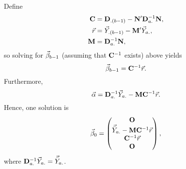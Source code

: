 Define
\begin{align*}
    \mathbf{C} & =\mathbf{D}_{.(b-1)}-\mathbf{N}'\mathbf{D}_{a.}^{-1}\mathbf{N}, \\
    \vec{r} & =\vec{Y}_{.(b-1)}-\mathbf{M}'\vec{Y}_{a.},                \\
    \mathbf{M} & =\mathbf{D}_{a.}^{-1}\mathbf{N},
\end{align*}
so solving for $ \vec{\beta}_{b-1} $ (assuming that $ \mathbf{C}^{-1} $ exists) above yields
\[ \vec{\beta}_{b-1}=\mathbf{C}^{-1}\vec{r}. \]
Furthermore,
\[ \vec{\alpha}=\mathbf{D}_{a.}^{-1}\vec{Y}_{a.}-\mathbf{M}\mathbf{C}^{-1}\vec{r}. \]
Hence, one solution is
\[ \vec{\beta}_0=\begin{pmatrix}
        \mathbf{O}                                                \\
        \vec{\bar{Y}}_{a.}-\mathbf{M}\mathbf{C}^{-1}\vec{r} \\
        \mathbf{C}^{-1}\vec{r}                                 \\
        \mathbf{O}
    \end{pmatrix}, \]
where $ \mathbf{D}_{a.}^{-1}\vec{Y}_{a.}=\vec{\bar{Y}}_{a.} $.

